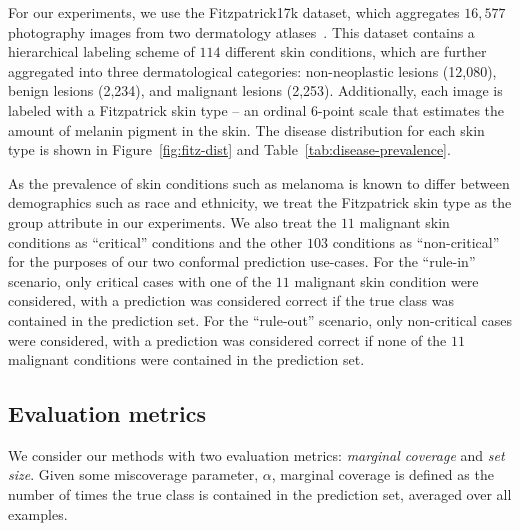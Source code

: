 \documentclass[letterpaper]{article} %
\begin{document}
        For our experiments, we use the Fitzpatrick17k dataset, which aggregates $16,577$ photography images from two dermatology atlases~\cite{Groh2021EvaluatingDN}. 
        This dataset contains a hierarchical labeling scheme of $114$ different skin conditions, which are further aggregated into three dermatological categories: non-neoplastic lesions (12,080), benign lesions (2,234), and malignant lesions (2,253).
        Additionally, each image is labeled with a Fitzpatrick skin type -- an ordinal 6-point scale that estimates the amount of melanin pigment in the skin.
        The disease distribution for each skin type is shown in Figure~\ref{fig:fitz-dist} and Table~\ref{tab:disease-prevalence}.
        
        As the prevalence of skin conditions such as melanoma is known to differ between demographics such as race and ethnicity, we treat the Fitzpatrick skin type as the group attribute in our experiments.
        We also treat the $11$ malignant skin conditions as ``critical'' conditions and the other $103$ conditions as ``non-critical'' for the purposes of our two conformal prediction use-cases.
        For the ``rule-in'' scenario, only critical cases with one of the $11$ malignant skin condition were considered, with a prediction was considered correct if the true class was contained in the prediction set.
        For the ``rule-out'' scenario, only non-critical cases were considered, with a prediction was considered correct if none of the $11$ malignant conditions were contained in the prediction set.
        
    \subsection{Evaluation metrics}
        We consider our methods with two evaluation metrics: \textit{marginal coverage} and \textit{set size}.
        Given some miscoverage parameter, $\alpha$, marginal coverage is defined as the number of times the true class is contained in the prediction set, averaged over all examples.
        
\end{document}
